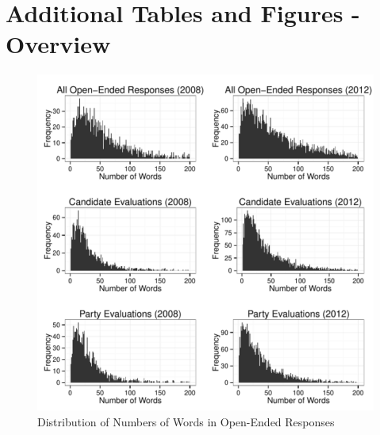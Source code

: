 \documentclass[12pt]{article}
\begin{document}
\clearpage
\section{Additional Tables and Figures - Overview}
\renewcommand\thefigure{\thesection.\arabic{figure}}
\renewcommand\thetable{\thesection.\arabic{table}}
\setcounter{figure}{0}
\setcounter{table}{0}



\begin{figure}[ht]\centering
\includegraphics[scale=.8]{../calc/fig/a0_num.pdf}
\caption{Distribution of Numbers of Words in Open-Ended Responses}\label{fig:a0_num}
\end{figure}
\end{document}
